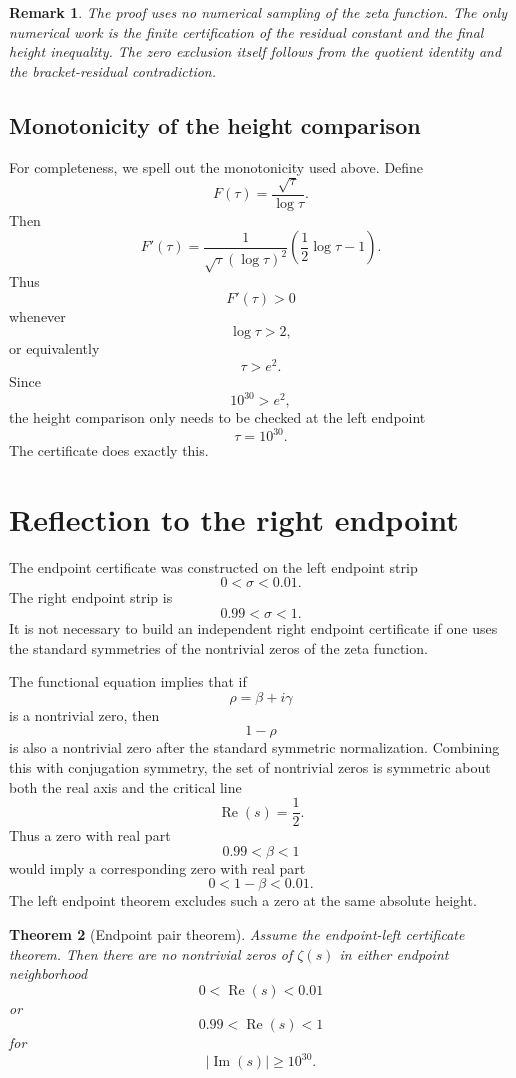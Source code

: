 \documentclass[11pt]{article}
\newtheorem{theorem}{Theorem}[section]
\newtheorem{remark}[theorem]{Remark}
\DeclareMathOperator{\Rea}{Re}
\DeclareMathOperator{\Ima}{Im}
\begin{document}
\begin{remark}
The proof uses no numerical sampling of the zeta function. The only numerical work is the finite certification of the residual constant and the final height inequality. The zero exclusion itself follows from the quotient identity and the bracket-residual contradiction.
\end{remark}

\subsection{Monotonicity of the height comparison}

For completeness, we spell out the monotonicity used above. Define
\[
F(\tau)=\frac{\sqrt{\tau}}{\log\tau}.
\]
Then
\[
F'(\tau)
=
\frac{1}{\sqrt{\tau}(\log\tau)^2}
\left(
\frac12\log\tau-1
\right).
\]
Thus
\[
F'(\tau)>0
\]
whenever
\[
\log\tau>2,
\]
or equivalently
\[
\tau>e^2.
\]
Since
\[
10^{30}>e^2,
\]
the height comparison only needs to be checked at the left endpoint
\[
\tau=10^{30}.
\]
The certificate does exactly this.

\section{Reflection to the right endpoint}

The endpoint certificate was constructed on the left endpoint strip
\[
0<\sigma<0.01.
\]
The right endpoint strip is
\[
0.99<\sigma<1.
\]
It is not necessary to build an independent right endpoint certificate if one uses the standard symmetries of the nontrivial zeros of the zeta function.

The functional equation implies that if
\[
\rho=\beta+i\gamma
\]
is a nontrivial zero, then
\[
1-\rho
\]
is also a nontrivial zero after the standard symmetric normalization. Combining this with conjugation symmetry, the set of nontrivial zeros is symmetric about both the real axis and the critical line
\[
\Rea(s)=\frac12.
\]
Thus a zero with real part
\[
0.99<\beta<1
\]
would imply a corresponding zero with real part
\[
0<1-\beta<0.01.
\]
The left endpoint theorem excludes such a zero at the same absolute height.

\begin{theorem}[Endpoint pair theorem]
Assume the endpoint-left certificate theorem. Then there are no nontrivial zeros of \(\zeta(s)\) in either endpoint neighborhood
\[
0<\Rea(s)<0.01
\]
or
\[
0.99<\Rea(s)<1
\]
for
\[
|\Ima(s)|\geq10^{30}.
\]
\end{theorem}
\end{document}
